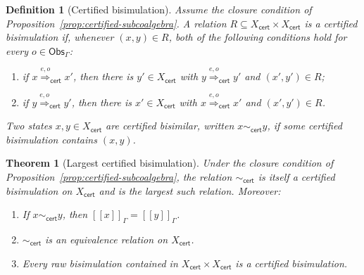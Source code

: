 \documentclass[a4paper,fleqn]{cas-sc}
\newtheorem{definition}{Definition}
\newtheorem{theorem}{Theorem}
\newcommand{\sem}[1]{\left[\!\left[#1\right]\!\right]}
\newcommand{\Obs}{\mathsf{Obs}}
\newcommand{\cert}{\mathsf{cert}}
\begin{document}
\begin{definition}[Certified bisimulation]\label{def:certified-bisimulation}
Assume the closure condition of Proposition~\ref{prop:certified-subcoalgebra}.
A relation \(R\subseteq X_{\cert}\times X_{\cert}\) is a
\emph{certified bisimulation} if, whenever \((x,y)\in R\), both of the
following conditions hold for every \(o\in\Obs_{\Gamma}\):
\begin{enumerate}
  \item if \(x\overset{e,o}{\Longrightarrow}_{\cert}x'\), then there is
  \(y'\in X_{\cert}\) with
  \(y\overset{e,o}{\Longrightarrow}_{\cert}y'\) and \((x',y')\in R\);
  \item if \(y\overset{e,o}{\Longrightarrow}_{\cert}y'\), then there is
  \(x'\in X_{\cert}\) with
  \(x\overset{e,o}{\Longrightarrow}_{\cert}x'\) and \((x',y')\in R\).
\end{enumerate}
Two states \(x,y\in X_{\cert}\) are \emph{certified bisimilar}, written
\(x\sim_{\cert}y\), if some certified bisimulation contains \((x,y)\).
\end{definition}

\begin{theorem}[Largest certified bisimulation]\label{thm:largest-certified-bisimulation}
Under the closure condition of Proposition~\ref{prop:certified-subcoalgebra},
the relation \(\sim_{\cert}\) is itself a certified bisimulation on
\(X_{\cert}\) and is the largest such relation. Moreover:
\begin{enumerate}
  \item If \(x\sim_{\cert}y\), then \(\sem{x}_{\Gamma}=\sem{y}_{\Gamma}\).
  \item \(\sim_{\cert}\) is an equivalence relation on \(X_{\cert}\).
  \item Every raw bisimulation contained in
  \(X_{\cert}\times X_{\cert}\) is a certified bisimulation.
\end{enumerate}
\end{theorem}
\end{document}
